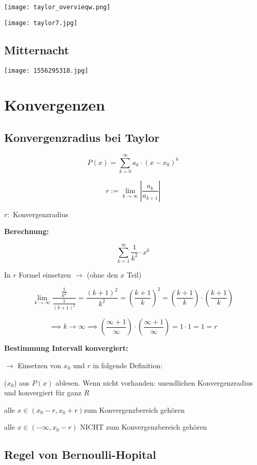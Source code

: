 \begin{multicols*}{3}
    { \texttt{[image: taylor\_overvieqw.png]} }

    { \texttt{[image: taylor7.jpg]} }

    \subsection{Mitternacht}
    { \texttt{[image: 1556295318.jpg]} }

    \vfill\null
    \columnbreak


    \section{Konvergenzen}
    \subsection{Konvergenzradius bei Taylor}

    $$P(x) = \sum_{k = 0}^{ \infty }a_k\cdot(x-x_0)^k$$

    {$$r:= \lim_{k \to \infty } |\frac{a_k}{a_{k+1}}| $$}

    {$r:$ Konvergenzradius}

    {\textbf{Berechnung:}}

    {$$\sum^{\infty}_{k=1}{\frac{1}{k^2}\cdot x^k}$$}

    {In $r$ Formel einsetzen $\to$ (ohne den $x$ Teil)}

    {$$ \lim_{k \to \infty} \frac{\frac{1}{k^2}}{\frac{1}{(k+1)^2}} = \frac{(k+1)^2}{k^2} = (\frac{k+1}{k})^2 = (\frac{k+1}{k}) \cdot (\frac{k+1}{k})  $$}

    {$$\implies k \to \infty \implies (\frac{\infty+1}{\infty}) \cdot (\frac{\infty+1}{\infty}) = 1 \cdot 1 = 1  =r$$}

    \textbf{Bestimmung Intervall konvergiert:}

    {$\to$ Einsetzen von $x_0$ und $r$ in folgende Definition:}

    {($x_0$) aus $P(x)$ ablesen. Wenn nicht vorhanden: unendlichen Konvergenzradius und konvergiert für ganz $R$ }


    {alle $x \in (x_0 -r,x_0 + r)$zum Konvergenzbereich gehören }



    {alle $x \in (-\infty,x_0 - r)$ NICHT zum Konvergenzbereich gehören }


    \subsection{Regel von Bernoulli-Hopital}



\end{multicols*}
